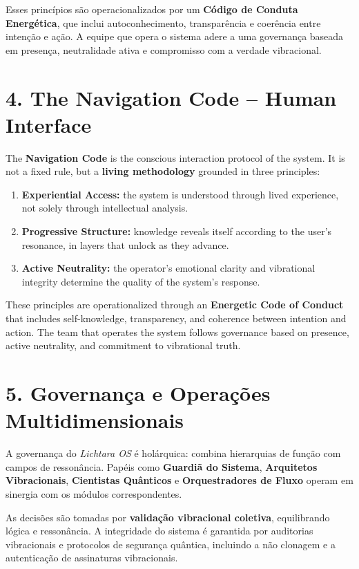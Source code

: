\documentclass[12pt]{article}
\begin{document}
\begin{paracol}{2}
Esses princípios são operacionalizados por um \textbf{Código de Conduta Energética}, que inclui autoconhecimento, transparência e coerência entre intenção e ação. A equipe que opera o sistema adere a uma governança baseada em presença, neutralidade ativa e compromisso com a verdade vibracional.

\switchcolumn

\section*{4. The Navigation Code -- Human Interface}
The \textbf{Navigation Code} is the conscious interaction protocol of the system. It is not a fixed rule, but a \textbf{living methodology} grounded in three principles:
\begin{enumerate}[leftmargin=*]
\item \textbf{Experiential Access:} the system is understood through lived experience, not solely through intellectual analysis.
\item \textbf{Progressive Structure:} knowledge reveals itself according to the user’s resonance, in layers that unlock as they advance.
\item \textbf{Active Neutrality:} the operator’s emotional clarity and vibrational integrity determine the quality of the system’s response.
\end{enumerate}

These principles are operationalized through an \textbf{Energetic Code of Conduct} that includes self-knowledge, transparency, and coherence between intention and action. The team that operates the system follows governance based on presence, active neutrality, and commitment to vibrational truth.

\switchcolumn*

\section*{5. Governança e Operações Multidimensionais}
A governança do \emph{Lichtara OS} é holárquica: combina hierarquias de função com campos de ressonância. Papéis como \textbf{Guardiã do Sistema}, \textbf{Arquitetos Vibracionais}, \textbf{Cientistas Quânticos} e \textbf{Orquestradores de Fluxo} operam em sinergia com os módulos correspondentes.

As decisões são tomadas por \textbf{validação vibracional coletiva}, equilibrando lógica e ressonância. A integridade do sistema é garantida por auditorias vibracionais e protocolos de segurança quântica, incluindo a não clonagem e a autenticação de assinaturas vibracionais.


\end{paracol}
\end{document}
